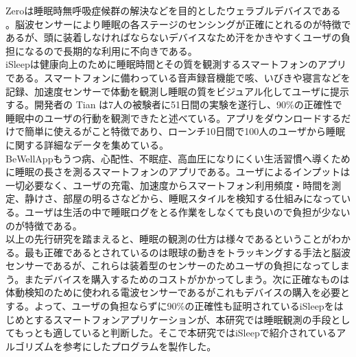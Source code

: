 Zeroは睡眠時無呼吸症候群の解決などを目的としたウェラブルデバイスである \cite{beWellApp}。脳波センサーにより睡眠の各ステージのセンシングが正確にとれるのが特徴であるが、頭に装着しなければならないデバイスなため汗をかきやすくユーザの負担になるので長期的な利用に不向きである。\\
iSleepは健康向上のために睡眠時間とその質を観測するスマートフォンのアプリである\cite{iSleep}。スマートフォンに備わっている音声録音機能で咳、いびきや寝言などを記録、加速度センサーで体動を観測し睡眠の質をビジュアル化してユーザに提示する。開発者の Tian は7人の被験者に51日間の実験を遂行し、90\%の正確性で睡眠中のユーザの行動を観測できたと述べている\cite{iSleep}。アプリをダウンロードするだけで簡単に使えるがこと特徴であり、ローンチ10日間で100人のユーザから睡眠に関する詳細なデータを集めている。\\
BeWellAppもうつ病、心配性、不眠症、高血圧になりにくい生活習慣へ導くために睡眠の長さを測るスマートフォンのアプリである。ユーザによるインプットは一切必要なく、ユーザの充電、加速度からスマートフォン利用頻度・時間を測定、静けさ、部屋の明るさなどから、睡眠スタイルを検知する仕組みになっている\cite{beWellApp}。ユーザは生活の中で睡眠ログをとる作業をしなくても良いので負担が少ないのが特徴である。\\
以上の先行研究を踏まえると、睡眠の観測の仕方は様々であるということがわかる。最も正確であるとされているのは眼球の動きをトラッキングする手法と脳波センサーであるが、これらは装着型のセンサーのためユーザの負担になってしまう。またデバイスを購入するためのコストがかかってしまう。次に正確なものは体動検知のために使われる電波センサーであるがこれもデバイスの購入を必要とする。よって、ユーザの負担ならずに90\%の正確性も証明されているiSleepをはじめとするスマートフォンアプリケーションが、本研究では睡眠観測の手段としてもっとも適していると判断した。そこで本研究ではiSleepで紹介されているアルゴリズムを参考にしたプログラムを製作した。

